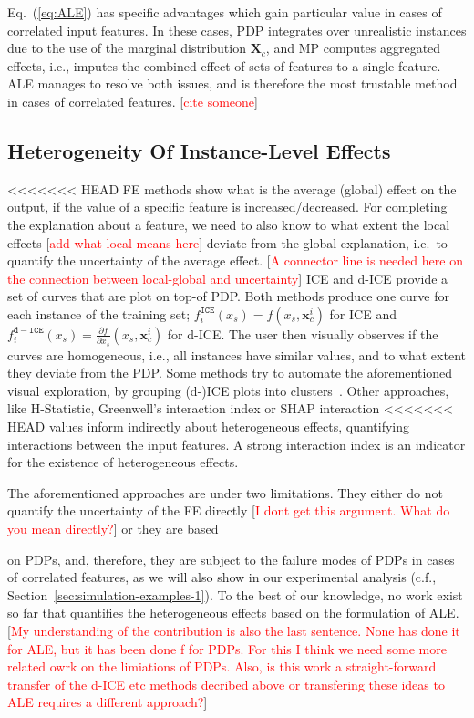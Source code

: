 \documentclass[twoside]{article}
\newcommand{\xc}{\mathbf{x}_c}
\newcommand{\todo}[1]{[\textcolor{red}{#1}]}
\begin{document}
Eq.~(\ref{eq:ALE}) has specific advantages which gain particular value in cases of
correlated input features. In these cases, PDP integrates over
unrealistic instances due to the use of the marginal distribution
\(\mathbf{X}_c \), and MP computes aggregated effects, i.e., imputes
the combined effect of sets of features to a single feature. ALE
manages to resolve both issues, and is therefore the most trustable
method in cases of correlated features. \todo{cite someone}

\subsection{Heterogeneity Of Instance-Level Effects}
\label{sec:quant-heter-effects}

<<<<<<< HEAD
FE methods show what is the average (global) effect on the output, if
the value of a specific feature is increased/decreased. For completing
the explanation about a feature, we need to also know to what extent
the local effects \todo{add what local means here} deviate from the
global explanation, i.e.~to quantify the uncertainty of the average
effect.
\todo{A connector line is needed here on the connection between local-global and uncertainty}
ICE and d-ICE\citep{goldstein2015peeking} provide a set of curves that
are plot on top-of PDP. Both methods produce one curve for each
instance of the training set;
\(f^{\mathtt{ICE}}_i(x_s) = f(x_s, \xc^i)\) for ICE and
\(f^{\mathtt{d-ICE}}_i(x_s) = \frac{\partial f}{\partial x_s} (x_s,
\xc^i)\) for d-ICE. The user then visually observes if the curves are
homogeneous, i.e., all instances have similar values, and to what extent they deviate from the PDP. Some methods
try to automate the aforementioned visual exploration, by grouping
(d-)ICE plots into clusters~\citep{molnar2020model,
  herbinger2022repid, britton2019vine}. Other approaches, like
H-Statistic\citep{friedman2008predictive}, Greenwell's interaction
index\citep{greenwell2018simple} or SHAP interaction
<<<<<<< HEAD
values\citep{lundberg2018consistent} inform indirectly about
heterogeneous effects, quantifying interactions between the input
features. A strong interaction index is an indicator for the existence
of heterogeneous effects.

The aforementioned approaches are under two limitations. They either
do not quantify the uncertainty of the FE directly  \todo{I dont get this argument. What do you mean directly?} or they are based

on PDPs, and, therefore, they are subject to the failure modes of PDPs
in cases of correlated features\citep{baniecki2021fooling}, as we will also show in our experimental analysis (c.f., Section~\ref{sec:simulation-examples-1}). To the best
of our knowledge, no work exist so far that quantifies the
heterogeneous effects based on the formulation of ALE.
\todo{My understanding of the contribution is also the last sentence. None has done it for ALE, but it has been done f for PDPs. For this I think we need some more related owrk on the limiations of PDPs. Also, is this work a straight-forward transfer of the d-ICE etc methods decribed above or transfering these ideas to ALE requires a different approach?}
\end{document}
